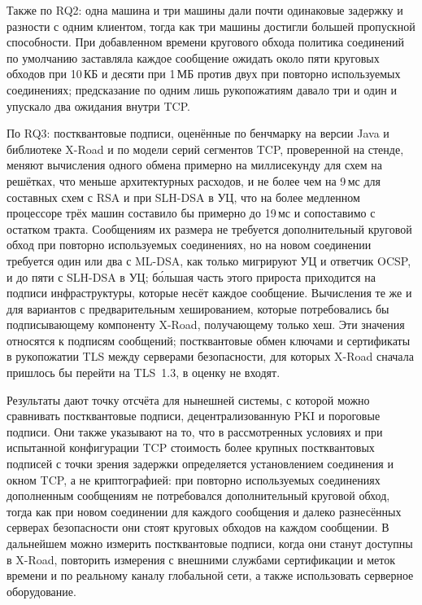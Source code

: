 \documentclass[conference,a4paper]{IEEEtran}
\newcommand{\newtext}[1]{{\color{blue}#1}}
\newcommand{\newred}[1]{{\color{red}#1}}
\newcommand{\newviolet}[1]{{\color{violet}#1}}
\begin{document}
\newtext{Также по RQ2}: одна машина и три машины дали почти одинаковые задержку и разности с одним
клиентом, тогда как три машины достигли большей пропускной способности. При добавленном времени кругового обхода
политика соединений по умолчанию заставляла каждое сообщение ожидать около пяти круговых обходов при 10\,КБ и десяти при 1\,МБ
против двух при повторно используемых соединениях; предсказание по одним лишь рукопожатиям давало три и один и
упускало два ожидания внутри TCP.

\newtext{По RQ3: постквантовые подписи, оценённые по бенчмарку на версии Java и
библиотеке X-Road и по модели серий сегментов TCP, проверенной на стенде, меняют вычисления
одного обмена примерно на миллисекунду для схем на решётках, что меньше архитектурных расходов,
и не более чем на 9\,мс для составных схем с RSA и при SLH-DSA в УЦ\newtext{, что на
более медленном процессоре трёх машин составило бы примерно до 19\,мс и сопоставимо с остатком
тракта}. Сообщениям их размера
не требуется дополнительный круговой обход при повторно используемых соединениях, но на новом соединении требуется один или два с ML-DSA,
как только мигрируют УЦ и ответчик OCSP, и до пяти с SLH-DSA в УЦ; б\'{о}льшая часть этого прироста приходится на
подписи инфраструктуры, которые несёт каждое сообщение.} \newviolet{Вычисления те же
и для вариантов с предварительным хешированием, которые потребовались бы подписывающему компоненту X-Road, получающему только
хеш.} \newred{Эти значения относятся к
подписям сообщений; постквантовые обмен ключами и сертификаты в рукопожатии TLS между
серверами безопасности, для которых X-Road сначала пришлось бы перейти на TLS~1.3, в оценку
не входят.}

Результаты дают точку отсчёта для нынешней системы, с которой можно сравнивать постквантовые подписи,
децентрализованную PKI и пороговые подписи. \newred{Они также указывают на то, что в
рассмотренных условиях и при испытанной конфигурации TCP стоимость более крупных постквантовых
подписей с точки зрения задержки определяется установлением соединения и окном TCP, а не криптографией: при
повторно используемых соединениях дополненным сообщениям не потребовался дополнительный круговой обход, тогда как при новом соединении
для каждого сообщения и далеко разнесённых серверах безопасности они стоят круговых обходов на каждом сообщении.} В дальнейшем можно измерить постквантовые
подписи, когда они станут доступны в X-Road, повторить измерения с внешними службами сертификации и
меток времени и по реальному каналу глобальной сети, а также использовать серверное оборудование.
\end{document}
